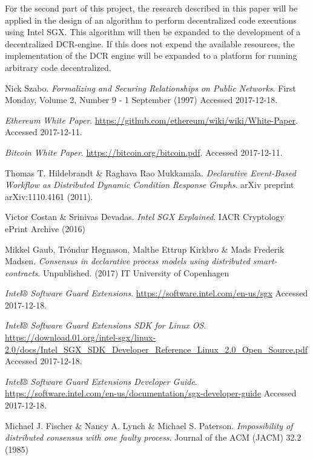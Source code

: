 \documentclass[12pt]{article}
\begin{document}
	For the second part of this project, the research described in this paper will be applied in the design of an algorithm to perform decentralized code executions using Intel SGX.
	This algorithm will then be expanded to the development of a decentralized DCR-engine.
	If this does not expend the available resources, the implementation of the DCR engine will be expanded to a platform for running arbitrary code decentralized.

	\begin{thebibliography}{9}

		Nick Szabo.
		\textit{Formalizing and Securing Relationships on Public Networks}.
		First Monday, Volume 2, Number 9 - 1 September (1997)
		Accessed 2017-12-18.

		\textit{Ethereum White Paper}.
		\url{https://github.com/ethereum/wiki/wiki/White-Paper}.
		Accessed 2017-12-11.

		\textit{Bitcoin White Paper}.
		\url{https://bitcoin.org/bitcoin.pdf}.
		Accessed 2017-12-11.

		Thomas T. Hildebrandt \& Raghava Rao Mukkamala.
		\textit{Declarative Event-Based Workflow as Distributed Dynamic Condition Response Graphs}.
		arXiv preprint arXiv:1110.4161 (2011).

		Victor Costan \& Srinivas Devadas.
		\textit{Intel SGX Explained}.
		IACR Cryptology ePrint Archive (2016)

		Mikkel Gaub, Tróndur Høgnason, Malthe Ettrup Kirkbro \& Mads Frederik Madsen.
		\textit{Consensus in declarative process models using distributed smart-contracts}.
		Unpublished. (2017)
		IT University of Copenhagen  

		\textit{Intel® Software Guard Extensions}.
		\url{https://software.intel.com/en-us/sgx}
		Accessed 2017-12-18.

		\textit{Intel® Software Guard Extensions SDK for Linux OS}.
		\url{https://download.01.org/intel-sgx/linux-2.0/docs/Intel_SGX_SDK_Developer_Reference_Linux_2.0_Open_Source.pdf}
		Accessed 2017-12-18.

		\textit{Intel® Software Guard Extensions Developer Guide}.
		\url{https://software.intel.com/en-us/documentation/sgx-developer-guide}
		Accessed 2017-12-18.

		Michael J. Fischer \&  Nancy A. Lynch \& Michael S. Paterson.
		\textit{Impossibility of distributed consensus with one faulty process}.
		Journal of the ACM (JACM) 32.2 (1985)


\end{thebibliography}
\end{document}
